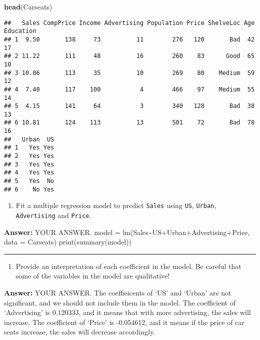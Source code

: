 \documentclass[
]{article}
\newenvironment{Shaded}{\begin{snugshade}}{\end{snugshade}}
\newcommand{\KeywordTok}[1]{\textcolor[rgb]{0.13,0.29,0.53}{\textbf{#1}}}
\newcommand{\NormalTok}[1]{#1}
\providecommand{\tightlist}{%
  \setlength{\itemsep}{0pt}\setlength{\parskip}{0pt}}
\begin{document}
\begin{Shaded}
\begin{Highlighting}[]
\KeywordTok{head}\NormalTok{(Carseats)}
\end{Highlighting}
\end{Shaded}

\begin{verbatim}
##   Sales CompPrice Income Advertising Population Price ShelveLoc Age Education
## 1  9.50       138     73          11        276   120       Bad  42        17
## 2 11.22       111     48          16        260    83      Good  65        10
## 3 10.06       113     35          10        269    80    Medium  59        12
## 4  7.40       117    100           4        466    97    Medium  55        14
## 5  4.15       141     64           3        340   128       Bad  38        13
## 6 10.81       124    113          13        501    72       Bad  78        16
##   Urban  US
## 1   Yes Yes
## 2   Yes Yes
## 3   Yes Yes
## 4   Yes Yes
## 5   Yes  No
## 6    No Yes
\end{verbatim}

\begin{enumerate}
\def\labelenumi{(\alph{enumi})}
\tightlist
\item
  Fit a multiple regression model to predict \texttt{Sales} using
  \texttt{US}, \texttt{Urban}, \texttt{Advertising} and \texttt{Price}.
\end{enumerate}

\textbf{Answer:} YOUR ANSWER. model =
lm(Sales\textasciitilde US+Urban+Advertising+Price, data = Carseats)
print(summary(model))

\begin{center}\rule{0.5\linewidth}{\linethickness}\end{center}

\begin{enumerate}
\def\labelenumi{(\alph{enumi})}
\setcounter{enumi}{1}
\tightlist
\item
  Provide an interpretation of each coefficient in the model. Be careful
  that some of the variables in the model are qualitative!
\end{enumerate}

\textbf{Answer:} YOUR ANSWER. The coeffieicents of `US' and `Urban' are
not significant, and we should not include them in the model. The
coefficient of `Advertising' is 0.120333, and it means that with more
advertising, the sales will increase. The coefficient of `Price' is
-0.054612, and it means if the price of car seats increase, the sales
will decrease accordingly.
\end{document}
